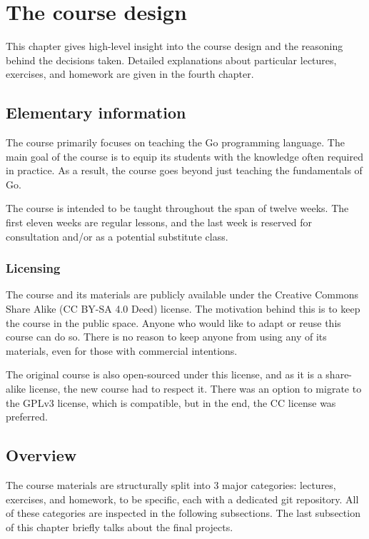 \documentclass[
  digital,
  color,
  oneside,
  nosansbold,
  nocolorbold,
  lof,
  lot,
]{fithesis4}
\begin{document}
\chapter{The course design}

This chapter gives high-level insight into the course design and the reasoning behind the decisions taken. Detailed explanations about particular lectures, exercises, and homework are given in the fourth chapter.

\section{Elementary information}

The course primarily focuses on teaching the Go programming language. The main goal of the course is to equip its students with the knowledge often required in practice. As a result, the course goes beyond just teaching the fundamentals of Go.

The course is intended to be taught throughout the span of twelve weeks. The first eleven weeks are regular lessons, and the last week is reserved for consultation and/or as a potential substitute class.

\subsection{Licensing}

The course and its materials are publicly available under the Creative Commons Share Alike (CC BY-SA 4.0 Deed) license. The motivation behind this is to keep the course in the public space. Anyone who would like to adapt or reuse this course can do so. There is no reason to keep anyone from using any of its materials, even for those with commercial intentions.

The original course is also open-sourced under this license, and as it is a share-alike license, the new course had to respect it. There was an option to migrate to the GPLv3 license, which is compatible, but in the end, the CC license was preferred.

\section{Overview}

The course materials are structurally split into 3 major categories: lectures, exercises, and homework, to be specific, each with a dedicated git repository. All of these categories are inspected in the following subsections. The last subsection of this chapter briefly talks about the final projects.
\end{document}
